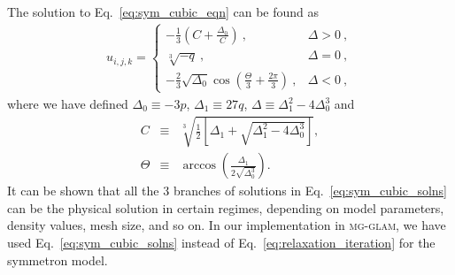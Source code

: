 The solution to Eq.~\eqref{eq:sym_cubic_eqn} can be found as
\begin{align}\label{eq:sym_cubic_solns}
    u_{i,j,k} = \begin{cases}
        \displaystyle -\frac{1}{3} \left( C + \frac{\Delta_0}{C} \right) \ , & \Delta > 0  \ , \\
        \displaystyle \sqrt[3]{-q} \ , & \Delta = 0 \ , \\
        \displaystyle -\frac{2}{3} \sqrt{\Delta_0} \cos \left( \frac{\Theta}{3} + \frac{2\pi}{3} \right) \ , & \Delta < 0 \ ,
    \end{cases} 
\end{align}
where we have defined $\Delta_0 \equiv -3p$, $\Delta_1 \equiv 27 q$, $\Delta \equiv \Delta_1^2 - 4 \Delta_0^3$ and 
\begin{eqnarray}
    C &\equiv& \sqrt[3]{\frac{1}{2} \left[ \Delta_1 + \sqrt{\Delta_1^2 - 4 \Delta_0^3} \right]},\\ 
    \Theta &\equiv& \arccos \left( \frac{\Delta_1}{2\sqrt{\Delta_0^3}}\right).
\end{eqnarray}
It can be shown that all the 3 branches of solutions in Eq.~\eqref{eq:sym_cubic_solns} can be the physical solution in certain regimes, depending on model parameters, density values, mesh size, and so on. In our implementation in \textsc{mg}-\textsc{glam}, we have used Eq.~\eqref{eq:sym_cubic_solns} instead of Eq.~\eqref{eq:relaxation_iteration} for the symmetron model. 

